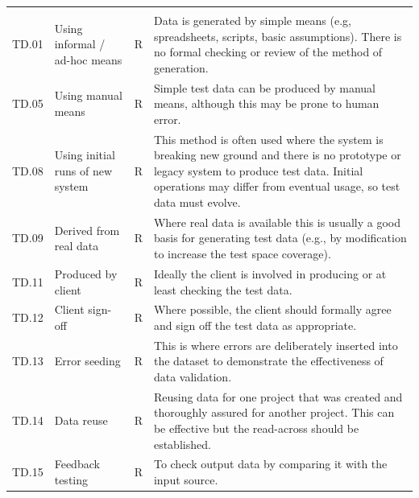 \addtocounter{table}{-1} %
\begin{longtable*}{|C{}|L{}|C{}|L{}|}
   &  &  & \\\hline
  \endfirsthead
   &  &  & \\\hline
  \endhead
  \endfoot\endlastfoot
   TD.01 & Using informal / ad-hoc means & R & Data is generated by simple means (e.g, spreadsheets, scripts, basic assumptions). There is no formal checking or review of the method of generation.\\
  \hline
   TD.05 & Using manual means & R & Simple test data can be produced by manual means, although this may be prone to human error.\\
  \hline
   TD.08 & Using initial runs of new system & R & This method is often used where the system is breaking new ground and there is no prototype or legacy system to produce test data. Initial operations may differ from eventual usage, so test data must evolve.\\
  \hline
   TD.09 & Derived from real data & R & Where real data is available this is usually a good basis for generating test data (e.g., by modification to increase the test space coverage).\\
  \hline
   TD.11 & Produced by client & R & Ideally the client is involved in producing or at least checking the test data.\\
  \hline
   TD.12 & Client sign-off & R & Where possible, the client should formally agree and sign off the test data as appropriate.\\
  \hline
   TD.13 & Error seeding & R & This is where errors are deliberately inserted into the \gls{dataset} to demonstrate the effectiveness of data \gls{validation}.\\
  \hline
   TD.14 & Data reuse & R & Reusing data for one project that was created and thoroughly assured for another project. This can be effective but the read-across should be established.\\
  \hline
   TD.15 & Feedback testing & R & To check output data by comparing it with the input source.\\
  \hline
\end{longtable*}

